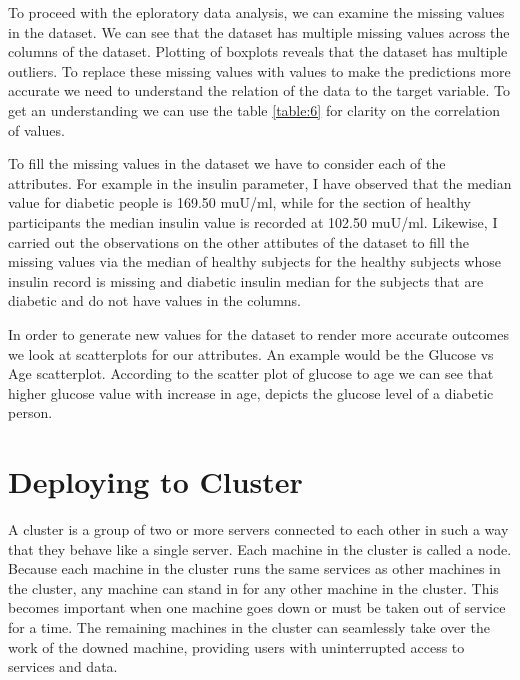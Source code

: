 \documentclass[12pt]{article}
\begin{document}
To proceed with the eploratory data analysis, we can examine the missing values in the dataset. We can see that the dataset has multiple missing values across the columns of the dataset. Plotting of boxplots reveals that the dataset has multiple outliers. To replace these missing values with values to make the predictions more accurate we need to understand the relation of the data to the target variable. To get an understanding we can use the table \ref{table:6} for clarity on the correlation of values.

To fill the missing values in the dataset we have to consider each of the attributes. For example in the insulin parameter, I have observed that the median value for diabetic people is 169.50 muU/ml, while for the section of healthy participants the median insulin value is recorded at 102.50 muU/ml. Likewise, I carried out the observations on the other attibutes of the dataset to fill the missing values via the median of healthy subjects for the healthy subjects whose insulin record is missing and diabetic insulin median for the subjects that are diabetic and do not have values in the columns.

In order to generate new values for the dataset to render more accurate outcomes we look at scatterplots for our attributes. An example would be the Glucose vs Age scatterplot. According to the scatter plot of glucose to age we can see that higher glucose value with increase in age, depicts the glucose level of a diabetic person. 


\newpage
\section{Deploying to Cluster}
A cluster is a group of two or more servers connected to each other in such a way that they behave like a single server. Each machine in the cluster is called a node. Because each machine in the cluster runs the same services as other machines in the cluster, any machine can stand in for any other machine in the cluster. This becomes important when one machine goes down or must be taken out of service for a time. The remaining machines in the cluster can seamlessly take over the work of the downed machine, providing users with uninterrupted access to services and data.
\end{document}
